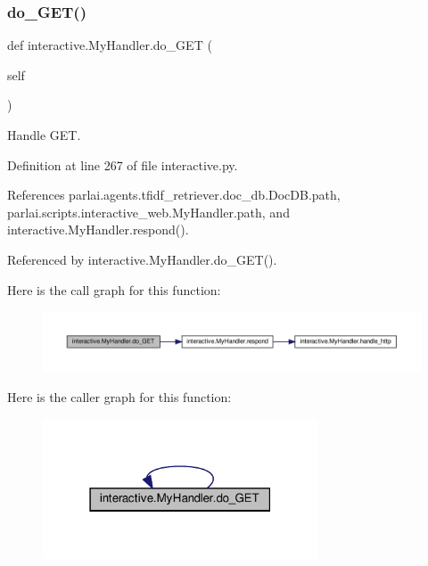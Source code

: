 \subsubsection{\texorpdfstring{do\+\_\+\+G\+E\+T()}{do\_GET()}\hspace{0.1cm}{\footnotesize\ttfamily [2/2]}}
{\footnotesize\ttfamily def interactive.\+My\+Handler.\+do\+\_\+\+G\+ET (\begin{DoxyParamCaption}\item[{}]{self }\end{DoxyParamCaption})}

\begin{DoxyVerb}Handle GET.\end{DoxyVerb}
 

Definition at line 267 of file interactive.\+py.



References parlai.\+agents.\+tfidf\+\_\+retriever.\+doc\+\_\+db.\+Doc\+D\+B.\+path, parlai.\+scripts.\+interactive\+\_\+web.\+My\+Handler.\+path, and interactive.\+My\+Handler.\+respond().



Referenced by interactive.\+My\+Handler.\+do\+\_\+\+G\+E\+T().

Here is the call graph for this function\+:
\nopagebreak
\begin{figure}[H]
\begin{center}
\leavevmode
\includegraphics[width=350pt]{classinteractive_1_1MyHandler_a718f9206286bfce516ecbc3cd33bb960_cgraph}
\end{center}
\end{figure}
Here is the caller graph for this function\+:
\nopagebreak
\begin{figure}[H]
\begin{center}
\leavevmode
\includegraphics[width=231pt]{classinteractive_1_1MyHandler_a718f9206286bfce516ecbc3cd33bb960_icgraph}
\end{center}
\end{figure}
\mbox{\label{classinteractive_1_1MyHandler_a6255cc42ad4ffd494808bed1c0e2b3fb}} 
